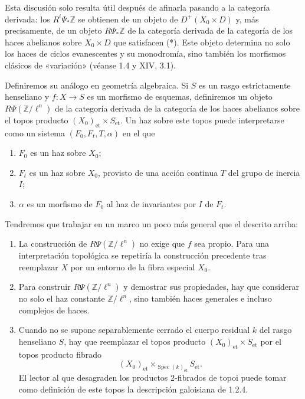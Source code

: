 \pageoriginale

Esta discusión solo resulta útil después de afinarla pasando a la categoría
derivada: los $R^i\Psi_*\mathbb Z$ se obtienen de un objeto de
$D^+(X_0\times D)$ y, más precisamente, de un objeto
$R\Psi_*\mathbb Z$ de la categoría derivada de la categoría de los haces
abelianos sobre $X_0\times D$ que satisfacen (*). Este objeto determina no
solo los haces de ciclos evanescentes y su monodromía, sino también los
morfismos clásicos de «variación» (véanse 1.4 y XIV, 3.1).

Definiremos su análogo en geometría algebraica. Si $S$ es un rasgo
estrictamente henseliano y $f:X\longrightarrow S$ es un morfismo de esquemas,
definiremos un objeto $R\Psi(\mathbb Z/\ell^n)$ de la categoría derivada de
la categoría de los haces abelianos sobre el topos producto
$(X_0)_{\mathrm{et}}\times S_{\mathrm{et}}$. Un haz sobre este topos puede
interpretarse como un sistema $(F_0,F_t,T,\alpha)$ en el que
\begin{enumerate}[label=\alph*),leftmargin=2.5em]
\item[$\alpha$)] $F_0$ es un haz sobre $X_0$;
\item[$\beta$)] $F_t$ es un haz sobre $X_0$, provisto de una acción continua $T$ del
grupo de inercia $I$;
\item[$\gamma$)] $\alpha$ es un morfismo de $F_0$ al haz de invariantes por $I$ de
$F_t$.
\end{enumerate}

Tendremos que trabajar en un marco un poco más general que el descrito arriba:
\begin{enumerate}[label=\alph*),leftmargin=2.5em]
\item La construcción de $R\Psi(\mathbb Z/\ell^n)$ no exige que $f$ sea
propio. Para una interpretación topológica se repetiría la construcción
precedente tras reemplazar $X$ por un entorno de la fibra especial $X_0$.

\item Para construir $R\Psi(\mathbb Z/\ell^n)$ y demostrar sus propiedades,
hay que considerar no solo el haz constante $\mathbb Z/\ell^n$, sino también
haces generales e incluso complejos de haces.

\item Cuando no se supone separablemente cerrado el cuerpo residual $k$ del
rasgo henseliano $S$, hay que reemplazar el topos producto
$(X_0)_{\mathrm{et}}\times S_{\mathrm{et}}$ por el topos producto fibrado
\begin{equation*}
(X_0)_{\mathrm{et}}
\times_{\operatorname{Spec}(k)_{\mathrm{et}}}S_{\mathrm{et}}.
\end{equation*}
El lector al que desagraden los productos $2$-fibrados de topoi puede tomar
como definición de este topos la descripción galoisiana de 1.2.4.
\end{enumerate}

